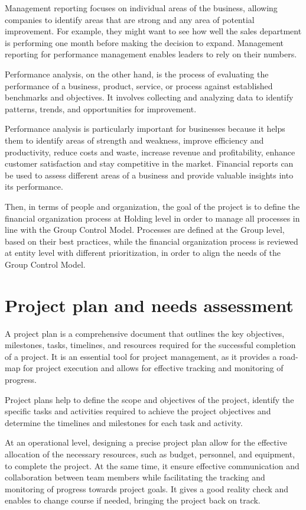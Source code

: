 \documentclass[12pt,a4paper,openright,twoside]{book}
\begin{document}
Management reporting focuses on individual areas of the business, allowing companies to identify areas that are strong and any area of potential improvement. 
%
For example, they might want to see how well the sales department is performing one month before making the decision to expand. Management reporting for performance management enables leaders to rely on their numbers.

Performance analysis, on the other hand, is the process of evaluating the performance of a business, product, service, or process against established benchmarks and objectives. 
%
It involves collecting and analyzing data to identify patterns, trends, and opportunities for improvement.

Performance analysis is particularly important for businesses because it helps them to identify areas of strength and weakness, improve efficiency and productivity, reduce costs and waste, increase revenue and profitability, enhance customer satisfaction and stay competitive in the market.
%
Financial reports can be used to assess different areas of a business and provide valuable insights into its performance.

Then, in terms of people and organization, the goal of the project is to define the financial organization process at Holding level in order to manage all processes in line with the Group Control Model.
%
Processes are defined at the Group level, based on their best practices, while the financial organization process is reviewed at entity level with different prioritization, in order to align the needs of the Group Control Model.

\section{Project plan and needs assessment}

A project plan is a comprehensive document that outlines the key objectives, milestones, tasks, timelines, and resources required for the successful completion of a project. 
%
It is an essential tool for project management, as it provides a road-map for project execution and allows for effective tracking and monitoring of progress.

Project plans help to define the scope and objectives of the project, identify the specific tasks and activities required to achieve the project objectives and determine the timelines and milestones for each task and activity.

At an operational level, designing a precise project plan allow for the effective allocation of the necessary resources, such as budget, personnel, and equipment, to complete the project.
%
At the same time, it ensure effective communication and collaboration between team members while facilitating the tracking and monitoring of progress towards project goals.
%
It gives a good reality check and enables to change course if needed, bringing the project back on track. 
\end{document}
